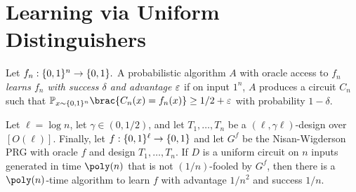 \section{Learning via Uniform Distinguishers}


\begin{definition}
  Let $f_n : \{0, 1\}^n \to \{0, 1\}.$ A probabilistic algorithm $A$ with
  oracle access to $f_n$ \emph{learns $f_n$ with success $\delta$ and advantage
  $\varepsilon$} if on input $1^n$, $A$ produces a circuit $C_n$ such that
  $\Pr_{x \sim \{0, 1\}^n} \brac{C_n(x) = f_n(x)} \geq 1/2 + \eps$ with
  probability $1 - \delta$.
\end{definition}

\begin{proposition}\label{prop:learning}
  Let $\ell = \log{n}$, let $\gamma \in (0, 1/2)$, and let $T_1, \dots, T_n$ be
  a $(\ell, \gamma \ell)$-design over $[O(\ell)]$. Finally, let $f :
  \{0,1\}^\ell \to \{0, 1\}$ and let $G^f$ be the Nisan-Wigderson PRG with
  oracle $f$ and design $T_1, \dots, T_n$. If $D$ is a uniform circuit on $n$
  inputs generated in time $\poly(n)$ that is not $(1/n)$-fooled by $G^f$, then
  there is a $\poly(n)$-time algorithm to learn $f$ with advantage $1/n^2$ and
  success $1/n$.
\end{proposition}

